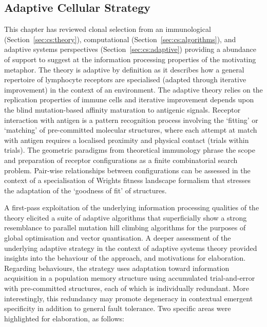 %
%
\subsection{Adaptive Cellular Strategy}
This chapter has reviewed clonal selection from an immunological (Section~\ref{sec:cs:theory}), computational (Section~\ref{sec:cs:algorithms}), and adaptive systems perspectives (Section~\ref{sec:cs:adaptive}) providing a abundance of support to suggest at the information processing properties of the motivating metaphor.
The theory is adaptive by definition as it describes how a general repertoire of lymphocyte receptors are specialised (adapted through iterative improvement) in the context of an environment. The adaptive theory relies on the replication properties of immune cells and iterative improvement depends upon the blind mutation-based affinity maturation to antigenic signals.
Receptor interaction with antigen is a pattern recognition process involving the `fitting' or `matching' of pre-committed molecular structures, where each attempt at match with antigen requires a localised proximity and physical contact (trials within trials). 
The geometric paradigms from theoretical immunology phrase the scope and preparation of receptor configurations as a finite combinatorial search problem. Pair-wise relationships between configurations can be assessed in the context of a specialisation of Wrights fitness landscape formalism that stresses the adaptation of the `goodness of fit' of structures.

A first-pass exploitation of the underlying information processing qualities of the theory elicited a suite of adaptive algorithms that superficially show a strong resemblance to parallel mutation hill climbing algorithms for the purposes of global optimisation and vector quantisation.
A deeper assessment of the underlying adaptive strategy in the context of adaptive systems theory provided insights into the behaviour of the approach, and motivations for elaboration. Regarding behaviours, the strategy uses adaptation toward information acquisition in a population memory structure using accumulated trial-and-error with pre-committed structures, each of which is individually redundant. More interestingly, this redundancy may promote degeneracy in contextual emergent specificity in addition to general fault tolerance. Two specific areas were highlighted for elaboration, as follows:
	
%
%
